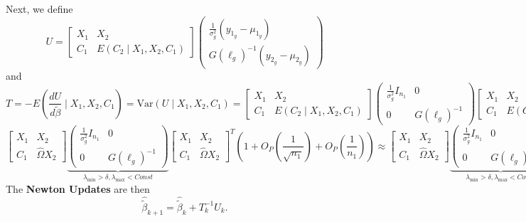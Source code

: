 \documentclass{article}
\begin{document}
Next, we define
\[
U = \left[ \begin{matrix}
X_1 & X_2\\
C_1 & E\left( C_2 \mid X_1, X_2, C_1 \right)
\end{matrix} \right] \left( \begin{matrix}
\frac{1}{\sigma_g^2} \left( y_{1_g} - \mu_{1_g} \right)\\
G\left( \ell_g \right)^{-1}\left( y_{2_g} - \mu_{2_g} \right)
\end{matrix} \right)
\]
and
\[
T = -E\left( \frac{dU}{d\tilde{\beta}} \mid X_1, X_2, C_1 \right) = \text{Var}\left( U \mid X_1, X_2, C_1 \right) = \left[ \begin{matrix}
X_1 & X_2\\
C_1 & E\left( C_2 \mid X_1, X_2, C_1 \right)
\end{matrix} \right] \left( \begin{matrix}
\frac{1}{\sigma_g^2} I_{n_1} & 0\\
0 & G\left( \ell_g \right)^{-1}
\end{matrix} \right) \left[ \begin{matrix}
X_1 & X_2\\
C_1 & E\left( C_2 \mid X_1, X_2, C_1 \right)
\end{matrix} \right]^T = 
\]
\[
\left[ \begin{matrix}
X_1 & X_2\\
C_1 & \hat{\Omega} X_2
\end{matrix} \right] \underbrace{\left( \begin{matrix}
\frac{1}{\sigma_g^2} I_{n_1} & 0\\
0 & G\left( \ell_g \right)^{-1}
\end{matrix} \right)}_{\lambda_{\min} > \delta, \lambda_{\max} < Const} \left[ \begin{matrix}
X_1 & X_2\\
C_1 & \hat{\Omega} X_2
\end{matrix} \right]^T \left( 1 + O_P\left( \frac{1}{\sqrt{n_1}} \right) + O_P\left( \frac{1}{n_1} \right) \right) \approx \left[ \begin{matrix}
X_1 & X_2\\
C_1 & \hat{\Omega} X_2
\end{matrix} \right] \underbrace{\left( \begin{matrix}
\frac{1}{\sigma_g^2} I_{n_1} & 0\\
0 & G\left( \ell_g \right)^{-1}
\end{matrix} \right)}_{\lambda_{\min} > \delta, \lambda_{\max} < Const} \left[ \begin{matrix}
X_1 & X_2\\
C_1 & \hat{\Omega} X_2
\end{matrix} \right]^T.
\]
The \textbf{Newton Updates} are then
\[
\hat{\tilde{\beta}}_{k+1} = \hat{\tilde{\beta}}_{k} + T_{k}^{-1} U_{k}.
\]
\end{document}
